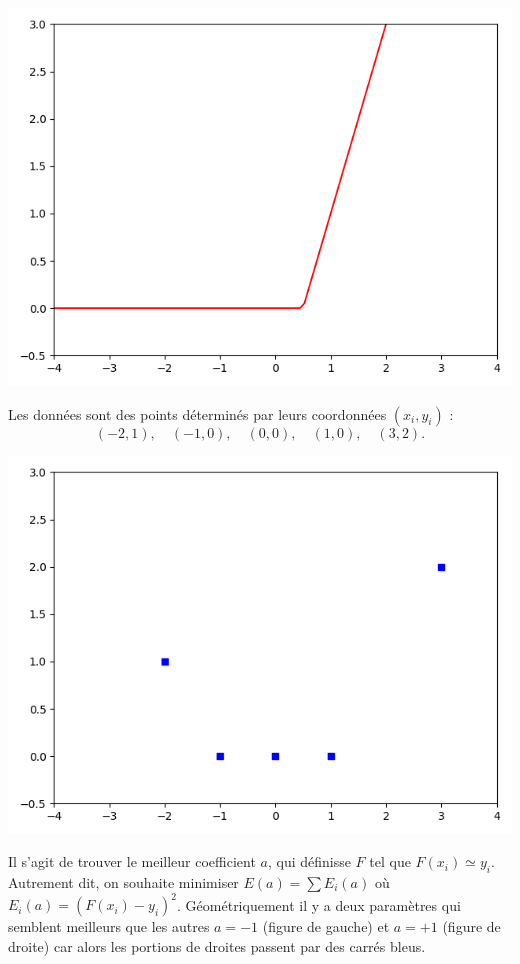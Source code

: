 \documentclass[11pt,class=report,crop=false]{standalone}
\begin{document}
\begin{center}
\includegraphics[scale=\myscale,scale=0.45]{figures/retro_04_d}
\end{center}

Les données sont des points déterminés par leurs coordonnées $(x_i,y_i)$ :
$$(-2,1),\quad  (-1,0),\quad (0,0),\quad (1,0),\quad (3,2).$$

\begin{center}
\includegraphics[scale=\myscale,scale=0.45]{figures/retro_04_a}
\end{center}

Il s'agit de trouver le meilleur coefficient $a$, qui définisse $F$ tel que $F(x_i) \simeq y_i$. Autrement dit, on souhaite minimiser $E(a) = \sum E_i(a)$ où $E_i(a) = (F(x_i)-y_i)^2$.
Géométriquement il y a deux paramètres qui semblent meilleurs que les autres $a=-1$ (figure de gauche) et $a=+1$ (figure de droite) car alors les portions de droites passent par des carrés bleus.
\end{document}
